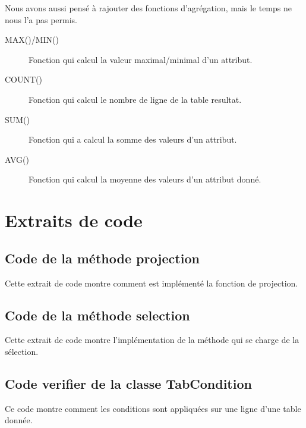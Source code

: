 \documentclass[oneside,13pt,a4paper]{report}
\begin{document}
Nous avons aussi pensé à rajouter des fonctions d'agrégation, mais le temps ne nous l'a pas permis.

\begin{description}
	\item[MAX()/MIN()] Fonction qui calcul la valeur maximal/minimal d'un attribut.
	\item[COUNT()] Fonction qui calcul le nombre de ligne de la table resultat.
	\item[SUM()] Fonction qui a calcul la somme des valeurs d'un attribut.
	\item[AVG()] Fonction qui calcul la moyenne des valeurs d'un attribut donné.
\end{description}


\appendix

\chapter{Extraits de code}

\section{Code de la méthode projection}

Cette extrait de code montre comment est implémenté la fonction de projection.



\section{Code de la méthode selection}

Cette extrait de code montre l'implémentation de la méthode qui se charge de la sélection.



\section{Code verifier de la classe TabCondition}

Ce code montre comment les conditions sont appliquées sur une ligne d'une table donnée.


\end{document}
